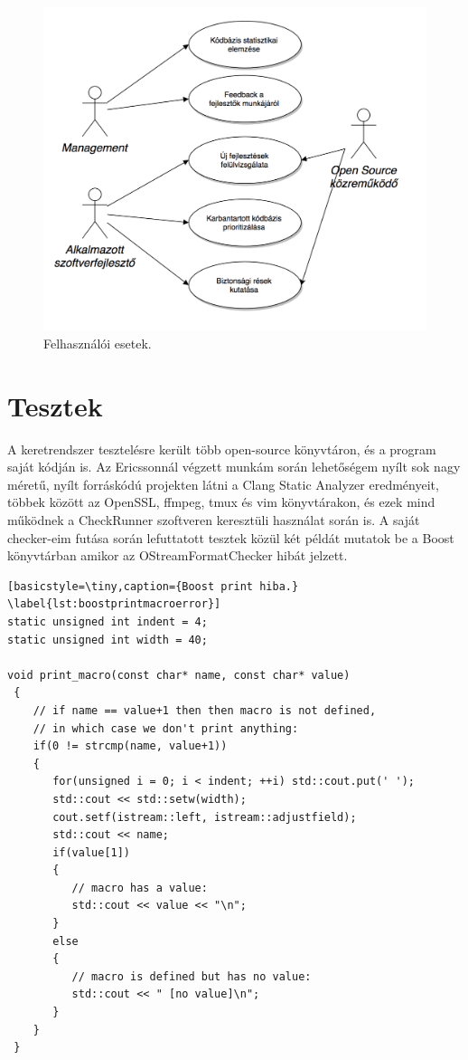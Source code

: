 \documentclass[a4paper,12pt]{report}
\begin{document}
\begin{figure}[h]
\caption{Felhasználói esetek.}
\centering
\includegraphics[scale=0.7]{felhasznaloi.png}
\end{figure}

\chapter{Tesztek}
A keretrendszer tesztelésre került több open-source könyvtáron, és a program saját kódján is. Az Ericssonnál végzett munkám során lehetőségem nyílt sok nagy méretű, nyílt forráskódú projekten látni a Clang Static Analyzer eredményeit, többek között az OpenSSL, ffmpeg, tmux és vim könyvtárakon, és ezek mind működnek a CheckRunner szoftveren keresztüli használat során is. A saját checker-eim futása során lefuttatott tesztek közül két példát mutatok be a Boost könyvtárban amikor az OStreamFormatChecker hibát jelzett.

\begin{lstlisting}[basicstyle=\tiny,caption={Boost print hiba.}
\label{lst:boostprintmacroerror}]
static unsigned int indent = 4;
static unsigned int width = 40;

void print_macro(const char* name, const char* value)
 {
    // if name == value+1 then then macro is not defined,
    // in which case we don't print anything:
    if(0 != strcmp(name, value+1))
    {
       for(unsigned i = 0; i < indent; ++i) std::cout.put(' ');
       std::cout << std::setw(width);
       cout.setf(istream::left, istream::adjustfield);
       std::cout << name;
       if(value[1])
       {
          // macro has a value:
          std::cout << value << "\n";
       }
       else
       {
          // macro is defined but has no value:
          std::cout << " [no value]\n";
       }
    }
 }
\end{lstlisting}
\end{document}
